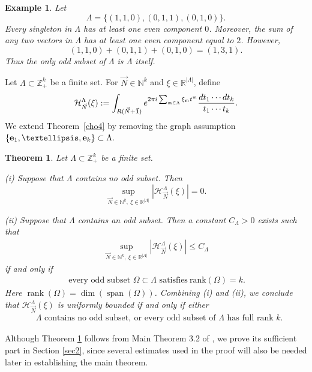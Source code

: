 \documentclass[10pt,a4paper]{amsart}
\newtheorem{theorem}{Theorem}\numberwithin{theorem}{section}
\newtheorem{exam}{Example}\numberwithin{exam}{section}
\numberwithin{equation}{section}
\begin{document}
\begin{exam}\label{eexx1}
	Let
	\[
	\Lambda=\{(1,1,0),(0,1,1),(0,1,0)\}.
	\]
	Every singleton in $\Lambda$ has at least one even component $0$.
	Moreover, the sum of any two vectors in $\Lambda$ has at least one even component equal to $2$.
	However,
	\[
	(1,1,0)+(0,1,1)+(0,1,0)=(1,3,1).
	\]
	Thus the only odd subset of $\Lambda$ is $\Lambda$ itself.
\end{exam}

Let $\Lambda\subset\mathbb Z_+^k$ be a finite set. For
$\vec N\in\mathbb N^k$ and
$\xi\in\mathbb R^{|\Lambda|}$, define
\[
\mathcal H_{\vec N}^{\Lambda}(\xi)
:=
\int_{R(\vec N+\vec{\bf{1}})}
e^{2\pi i\sum_{\mathfrak m\in\Lambda}
	\xi_{\mathfrak m}t^{\mathfrak m}}
\frac{dt_1\cdots dt_k}{t_1\cdots t_k}.
\]
We extend Theorem~\ref{cho4} by removing the graph
assumption
$
\{{\bf e}_1,\ldots,{\bf e}_k\}\subset\Lambda.
$

\begin{theorem}\label{thji}
	Let $\Lambda\subset \mathbb{Z}_+^k$ be a finite set.
	
	\medskip
	\noindent
	{\rm (i)} Suppose that $\Lambda$ contains no odd subset. Then
	\[
	\sup_{\vec{N}\in \mathbb{N}^{k},\ \xi\in\mathbb{R}^{|\Lambda|}}
	|\mathcal{H}^{\Lambda}_{\vec{N}}(\xi)| =0.
	\]
	
	\medskip
	\noindent
	{\rm (ii)} Suppose that $\Lambda$ contains an odd subset. Then  a constant $C_{\Lambda}>0 $ exists such that
	\begin{align*}
		\sup_{\vec{N}\in \mathbb{N}^k,\ \xi\in\mathbb{R}^{|\Lambda|}}
		\left| \mathcal{H}^{\Lambda}_{\vec{N}}(\xi)\right|
		\le C_{\Lambda}
	\end{align*}
	if and only if 
	\begin{align}\label{v16}
		\ \text{every odd subset $\Omega\subset \Lambda$ satisfies}\ 
		\mathrm{rank}(\Omega)=k .
	\end{align}
	Here $\operatorname{rank}(\Omega)=\dim(\operatorname{span}(\Omega))$.
	Combining {\rm(i)} and {\rm(ii)},  we  conclude that 
	$\mathcal H^\Lambda_{\vec N}(\xi)$
	is uniformly bounded  if and only if either
	\begin{align*}
		&\text{$\Lambda$ contains no odd subset},
		\ \text{or every odd subset of }\Lambda\text{ has full rank }k.
	\end{align*}
	
	
\end{theorem}


Although Theorem \ref{thji} follows from Main Theorem 3.2 of \cite{K}, we prove its sufficient part in Section \ref{sec2}, since
several estimates used in the proof will also be needed later in
establishing the main theorem.
\end{document}
